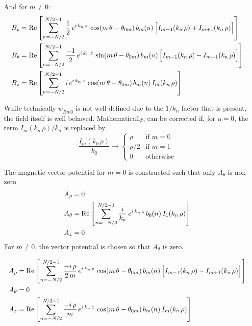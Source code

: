 And for $m \neq 0$:
\begin{align}
  B_\rho &= \operatorname{Re} \left[ 
    \sum_{n=-N/2}^{N/2-1} \frac{1}{2} \, e^{i \, k_n \, z} \, 
    \cos (m \, \theta - \theta_{0m}) \, b_m(n) \,
    \Big[ I_{m-1}(k_n \, \rho) + I_{m+1}(k_n \, \rho) \Big] \right] \nonumber \\
  B_\theta &= \operatorname{Re} \left[ 
    \sum_{n=-N/2}^{N/2-1} \frac{-1}{2} \, e^{i \, k_n \, z} \, 
    \sin (m \, \theta - \theta_{0m}) \, b_m(n) \,
    \Big[ I_{m-1}(k_n \, \rho) - I_{m+1}(k_n \, \rho) \Big] \right] \\
  B_z &= \operatorname{Re} \left[ 
    \sum_{n=-N/2}^{N/2-1} i \, e^{i \, k_n \, z} \, 
    \cos (m \, \theta - \theta_{0m}) \, b_m(n) \,
    I_m(k_n \, \rho) \right]
    \nonumber
\end{align}

While technically $\psi_{Bm0}$ is not well defined due to the $1/k_n$ factor
that is present, the field itself is well behaved. Mathematically,
 can be corrected if, for $n = 0$, the term $I_m(k_n \,
\rho) / k_n$ is replaced by
\begin{equation}
  \frac{I_m(k_0 \, \rho)}{k_0} \rightarrow 
  \begin{cases}
    \rho   &\text{if } m = 0 \\
    \rho/2 &\text{if } m = 1 \\
    0      &\text{otherwise}
  \end{cases}
\end{equation}

The magnetic vector potential for $m = 0$ is constructed such that
only $A_\theta$ is non-zero
\begin{align}
  A_\rho &= 0 \nonumber \\
  A_\theta &= \operatorname{Re} \left[ 
    \sum_{n=-N/2}^{N/2-1} \frac{i}{k_n} \, e^{i \, k_n \, z} \, b_0(n) \, I_1(k_n \, \rho) \right] \\
  A_z    &= 0 \nonumber
\end{align}
For $m \ne 0$, the vector potential is chosen so that $A_\theta$ is zero.

\begin{align}
  A_\rho &= \operatorname{Re} \left[ 
    \sum_{n=-N/2}^{N/2-1} \frac{-i \, \rho}{2 \, m} \, e^{i \, k_n \, z} \, 
    \cos (m \, \theta - \theta_{0m}) \, b_m(n) \,
    \Big[ I_{m-1}(k_n \, \rho) - I_{m+1}(k_n \, \rho) \Big] \right] \nonumber \\
  A_\theta &= 0 \\
  A_z    &= \operatorname{Re} \left[ 
    \sum_{n=-N/2}^{N/2-1} \frac{-i \, \rho}{m} \, e^{i \, k_n \, z} \, 
    \cos (m \, \theta - \theta_{0m}) \, b_m(n) \,
    I_m(k_n \, \rho) \right] \nonumber
\end{align}


